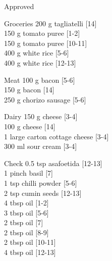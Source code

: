 \begin{menu}{Approved}
\begin{shoppinglist}{Groceries}
      200 g tagliatelli 
        {\scriptsize[14]}\\
      150 g tomato puree 
        {\scriptsize[1-2]}\\
      150 g tomato puree 
        {\scriptsize[10-11]}\\
      400 g white rice 
        {\scriptsize[5-6]}\\
      400 g white rice 
        {\scriptsize[12-13]}\\
      \end{shoppinglist}%
      \par\vfil %
      \begin{shoppinglist}{Meat}
      100 g bacon 
        {\scriptsize[5-6]}\\
      150 g bacon 
        {\scriptsize[14]}\\
      250 g chorizo sausage 
        {\scriptsize[5-6]}\\
      \end{shoppinglist}%
      \begin{shoppinglist}{Dairy}
      150 g cheese 
        {\scriptsize[3-4]}\\
      100 g cheese 
        {\scriptsize[14]}\\
      1 large carton cottage cheese 
        {\scriptsize[3-4]}\\
      300 ml sour cream 
        {\scriptsize[3-4]}\\
      \end{shoppinglist}%
      \par\vfil %
      \vfil\clearpage %
      \begin{shoppinglist}{Check}
      0.5 tsp asafoetida 
        {\scriptsize[12-13]}\\
      1 pinch basil 
        {\scriptsize[7]}\\
      1 tsp chilli powder 
        {\scriptsize[5-6]}\\
      2 tsp cumin seeds 
        {\scriptsize[12-13]}\\
      4 tbsp oil 
        {\scriptsize[1-2]}\\
      3 tbsp oil 
        {\scriptsize[5-6]}\\
      2 tbsp oil 
        {\scriptsize[7]}\\
      2 tbsp oil 
        {\scriptsize[8-9]}\\
      2 tbsp oil 
        {\scriptsize[10-11]}\\
      4 tbsp oil 
        {\scriptsize[12-13]}\\

\end{shoppinglist}
\end{menu}
